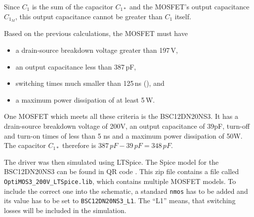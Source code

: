Since \(C_1\) is the sum of the capacitor \(C_{1*}\) and the MOSFET's output capacitance \(C_{1_M}\), %
this output capacitance cannot be greater than \(C_1\) itself.

Based on the previous calculations, the MOSFET must have

\begin{itemize}
    \item a drain-source breakdown voltage greater than 197\,V,
    \item an output capacitance less than 387\,pF,
    \item switching times much smaller than 125\,ns (), and
    \item a maximum power dissipation of at least 5\,W.
\end{itemize}

One MOSFET which meets all these criteria is the BSC12DN20NS3. It has a drain-source breakdown voltage of 200V, an output capacitance of 39pF, turn-off and turn-on times of less than 5 ns and a maximum power dissipation of 50W. The capacitor \(C_{1*}\) therefore is \(387\,pF - 39\,pF = 348\,pF\).

The driver was then simulated using LTSpice. The Spice model for the BSC12DN20NS3 can be found in QR code . This zip file contains a file called \texttt{OptiMOS3\_200V\_LTSpice.lib}, which contains multiple MOSFET models. To include the correct one into the schematic, a standard \texttt{nmos} has to be added and its value has to be set to \texttt{BSC12DN20NS3\_L1}. The \enquote{L1} means, that switching losses will be included in the simulation.

